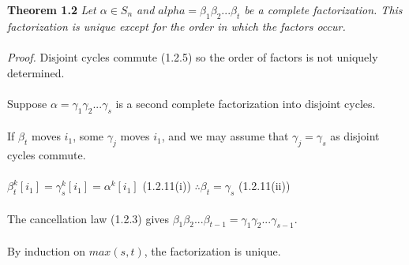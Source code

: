 \documentclass{article}
\begin{document}
\begin{redrules}\color{red}
\textbf{Theorem 1.2} \textit{Let \(\alpha\in S_n\) and \(alpha=\beta_1\beta_2...\beta_t\) be a complete factorization. This factorization is unique except for the order in which the factors occur.}\\\\\color{black}
\textit{Proof.} Disjoint cycles commute \color{gray}(1.2.5) \color{black} so the order of factors is not uniquely determined.\\\\
Suppose \(\alpha=\gamma_1\gamma_2...\gamma_s\) is a second complete factorization into disjoint cycles.\\\\
If \(\beta_t\) moves \(i_1\), some \(\gamma_j\) moves \(i_1\), and we may assume that \(\gamma_j=\gamma_s\) as disjoint cycles commute.\\\\
\(\beta_t^k[i_1]=\gamma_s^k[i_1]=\alpha^k[i_1]\) \color{gray}(1.2.11(i)) \color{black} \(\therefore \beta_t=\gamma_s\) \color{gray}(1.2.11(ii))\color{black}\\\\
The cancellation law \color{gray}(1.2.3) \color{black} gives \(\beta_1\beta_2...\beta_{t-1}=\gamma_1\gamma_2...\gamma_{s-1}\).\\\\
By induction on \(max(s,t)\), the factorization is unique.
\end{redrules}
\end{document}
